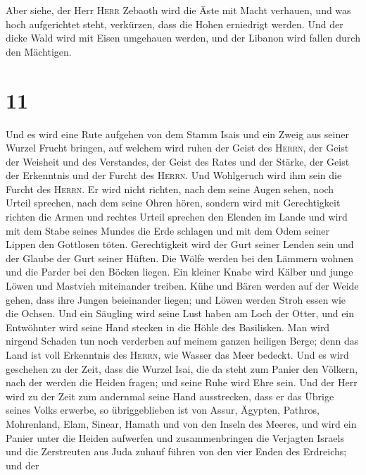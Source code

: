 Aber siehe, der Herr \textsc{Herr} Zebaoth wird die Äste
mit Macht verhauen, und was hoch aufgerichtet steht, verkürzen, dass die
Hohen erniedrigt werden.  Und der dicke Wald wird mit
Eisen umgehauen werden, und der Libanon wird fallen durch den Mächtigen.

\hypertarget{section-10}{%
\section{11}\label{section-10}}

 Und es wird eine Rute aufgehen von dem Stamm Isais und
ein Zweig aus seiner Wurzel Frucht bringen,  auf welchem
wird ruhen der Geist des \textsc{Herrn}, der Geist der Weisheit und des
Verstandes, der Geist des Rates und der Stärke, der Geist der Erkenntnis
und der Furcht des \textsc{Herrn}.  Und Wohlgeruch wird
ihm sein die Furcht des \textsc{Herrn}. Er wird nicht richten, nach dem
seine Augen sehen, noch Urteil sprechen, nach dem seine Ohren hören,
 sondern wird mit Gerechtigkeit richten die Armen und
rechtes Urteil sprechen den Elenden im Lande und wird mit dem Stabe
seines Mundes die Erde schlagen und mit dem Odem seiner Lippen den
Gottlosen töten.  Gerechtigkeit wird der Gurt seiner
Lenden sein und der Glaube der Gurt seiner Hüften.  Die
Wölfe werden bei den Lämmern wohnen und die Parder bei den Böcken
liegen. Ein kleiner Knabe wird Kälber und junge Löwen und Mastvieh
miteinander treiben.  Kühe und Bären werden auf der Weide
gehen, dass ihre Jungen beieinander liegen; und Löwen werden Stroh essen
wie die Ochsen.  Und ein Säugling wird seine Lust haben am
Loch der Otter, und ein Entwöhnter wird seine Hand stecken in die Höhle
des Basilisken.  Man wird nirgend Schaden tun noch
verderben auf meinem ganzen heiligen Berge; denn das Land ist voll
Erkenntnis des \textsc{Herrn}, wie Wasser das Meer bedeckt.
 Und es wird geschehen zu der Zeit, dass die Wurzel Isai,
die da steht zum Panier den Völkern, nach der werden die Heiden fragen;
und seine Ruhe wird Ehre sein.  Und der Herr wird zu der
Zeit zum andernmal seine Hand ausstrecken, dass er das Übrige seines
Volks erwerbe, so übriggeblieben ist von Assur, Ägypten, Pathros,
Mohrenland, Elam, Sinear, Hamath und von den Inseln des Meeres,
 und wird ein Panier unter die Heiden aufwerfen und
zusammenbringen die Verjagten Israels und die Zerstreuten aus Juda
zuhauf führen von den vier Enden des Erdreichs;  und der
